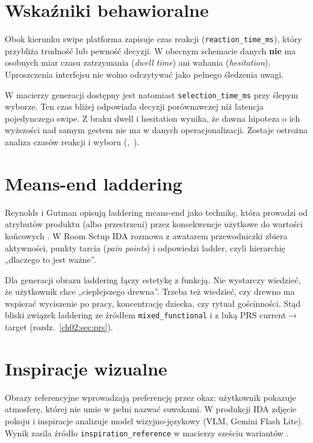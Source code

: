 \section{Wskaźniki behawioralne}
\label{ch03:sec:behavioral}

Obok kierunku swipe platforma zapisuje czas reakcji (\texttt{reaction\_time\_ms}), który przybliża trudność lub pewność decyzji.
W obecnym schemacie danych \textbf{nie} ma osobnych miar czasu zatrzymania (\emph{dwell time}) ani wahania (\emph{hesitation}). Uproszczenia interfejsu nie wolno odczytywać jako pełnego śledzenia uwagi.

W macierzy generacji dostępny jest natomiast \texttt{selection\_time\_ms} przy ślepym wyborze. Ten czas bliżej odpowiada decyzji porównawczej niż latencja pojedynczego swipe.
Z braku dwell i hesitation wynika, że dawna hipoteza o ich wyższości nad samym gestem nie ma w danych operacjonalizacji. Zostaje ostrożna analiza czasów reakcji i wyboru (,~).

\section{Means-end laddering}
\label{ch03:sec:laddering}

Reynolds i Gutman opisują laddering means-end jako technikę, która prowadzi od atrybutów produktu (albo przestrzeni) przez konsekwencje użytkowe do wartości końcowych \parencite{reynolds1988laddering}.
W Room Setup IDA rozmowa z awatarem przewodniczki zbiera aktywności, punkty tarcia (\emph{pain points}) i odpowiedzi ladder, czyli hierarchię „dlaczego to jest ważne”.

Dla generacji obrazu laddering łączy estetykę z funkcją. Nie wystarczy wiedzieć, że użytkownik chce „cieplejszego drewna”. Trzeba też wiedzieć, czy drewno ma wspierać wyciszenie po pracy, koncentrację dziecka, czy rytuał gościnności.
Stąd bliski związek laddering ze źródłem \texttt{mixed\_functional} i z luką PRS current$\rightarrow$target (rozdz.~\ref{ch02:sec:prs}).

\section{Inspiracje wizualne}
\label{ch03:sec:inspiracje}

Obrazy referencyjne wprowadzają preferencję przez okaz: użytkownik pokazuje atmosferę, której nie umie w pełni nazwać suwakami.
W produkcji IDA zdjęcie pokoju i inspiracje analizuje model wizyjno-językowy (VLM, Gemini Flash Lite). Wynik zasila źródło \texttt{inspiration\_reference} w macierzy sześciu wariantów \parencite{idaPlatform2026}.

